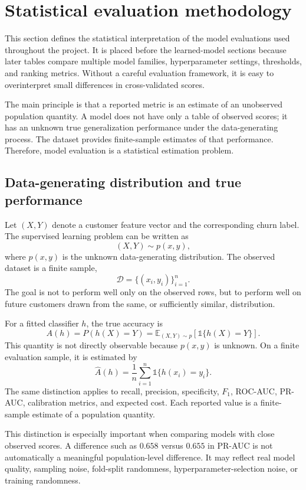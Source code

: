 \section{Statistical evaluation methodology}
\label{sec:statistical-evaluation-methodology}

This section defines the statistical interpretation of the model evaluations used throughout the project. It is placed before the learned-model sections because later tables compare multiple model families, hyperparameter settings, thresholds, and ranking metrics. Without a careful evaluation framework, it is easy to overinterpret small differences in cross-validated scores.

The main principle is that a reported metric is an estimate of an unobserved population quantity. A model does not have only a table of observed scores; it has an unknown true generalization performance under the data-generating process. The dataset provides finite-sample estimates of that performance. Therefore, model evaluation is a statistical estimation problem.

\subsection{Data-generating distribution and true performance}

Let \((X,Y)\) denote a customer feature vector and the corresponding churn label. The supervised learning problem can be written as
\[
(X,Y) \sim p(x,y),
\]
where \(p(x,y)\) is the unknown data-generating distribution. The observed dataset is a finite sample,
\[
\mathcal{D}
=
\{(x_i,y_i)\}_{i=1}^{n}.
\]
The goal is not to perform well only on the observed rows, but to perform well on future customers drawn from the same, or sufficiently similar, distribution.

For a fitted classifier \(h\), the true accuracy is
\[
A(h)
=
P(h(X)=Y)
=
\mathbb{E}_{(X,Y)\sim p}
\left[
\mathbb{1}\{h(X)=Y\}
\right].
\]
This quantity is not directly observable because \(p(x,y)\) is unknown. On a finite evaluation sample, it is estimated by
\[
\widehat{A}(h)
=
\frac{1}{n}
\sum_{i=1}^{n}
\mathbb{1}\{h(x_i)=y_i\}.
\]
The same distinction applies to recall, precision, specificity, \(F_1\), ROC-AUC, PR-AUC, calibration metrics, and expected cost. Each reported value is a finite-sample estimate of a population quantity.

This distinction is especially important when comparing models with close observed scores. A difference such as \(0.658\) versus \(0.655\) in PR-AUC is not automatically a meaningful population-level difference. It may reflect real model quality, sampling noise, fold-split randomness, hyperparameter-selection noise, or training randomness.


